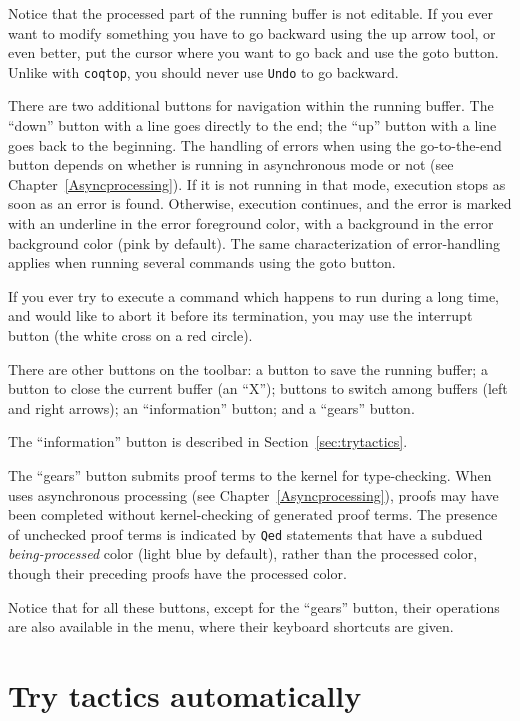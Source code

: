 Notice that the processed part of the running buffer is not editable. If
you ever want to modify something you have to go backward using the up
arrow tool, or even better, put the cursor where you want to go back
and use the \textsf{goto} button. Unlike with \verb|coqtop|, you
should never use \verb|Undo| to go backward.

There are two additional buttons for navigation within the running buffer.
The ``down'' button with a line goes directly to the end; the ``up'' button
with a line goes back to the beginning. The handling of errors when using the
go-to-the-end button depends on whether \Coq{} is running in asynchronous mode or not
(see Chapter~\ref{Asyncprocessing}). If it is not running in that mode, execution stops
as soon as an error is found. Otherwise, execution continues, and the
error is marked with an underline in the error foreground color, with a background in
the error background color (pink by default). The same characterization of
error-handling applies when running several commands using the \textsf{goto} button.

If you ever try to execute a command which happens to run during a
long time, and would like to abort it before its
termination, you may use the interrupt button (the white cross on a red circle).
 
There are other buttons on the \CoqIDE{} toolbar: a button to save the running
buffer; a button to close the current buffer (an ``X''); buttons to switch among
buffers (left and right arrows); an ``information'' button; and a ``gears'' button.

The ``information'' button is described in Section~\ref{sec:trytactics}.

The ``gears'' button submits proof terms to the \Coq{} kernel for type-checking.
When \Coq{} uses asynchronous processing (see Chapter~\ref{Asyncprocessing}), proofs may
have been completed without kernel-checking of generated proof terms. The presence of
unchecked proof terms is indicated by \texttt{Qed} statements
that have a subdued \emph{being-processed} color (light blue by default),
rather than the processed color, though their preceding proofs have the processed color.

Notice that for all these buttons, except for the ``gears'' button, their operations
are also available in the menu, where their keyboard shortcuts are given.

\section[Try tactics automatically]{Try tactics automatically\label{sec:trytactics}}

